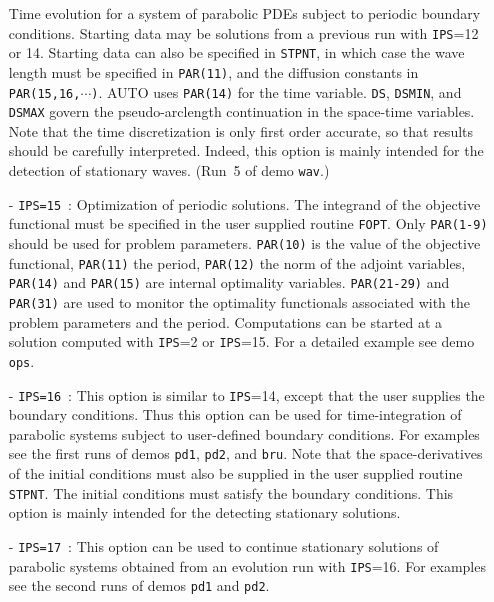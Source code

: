 \documentclass[12pt]{report}
\begin{document}
\begin{itemize}
  Time evolution for a system of parabolic PDEs subject to periodic 
  boundary conditions. 
  Starting data may be solutions from a previous run with {\tt IPS}=12 or 14. 
  Starting data can also be specified in {\tt STPNT}, in which case
  the wave length must be specified in {\tt PAR(11)}, and the diffusion
  constants in {\tt PAR(15,16,$\cdots$)}.
  {\cal AUTO} uses {\tt PAR(14)} for the time variable.
  {\tt DS}, {\tt DSMIN}, and {\tt DSMAX} govern the pseudo-arclength continuation 
  in the space-time variables.
  Note that the time discretization is only first order accurate, 
  so that results should be carefully interpreted. 
  Indeed, this option is mainly intended for the detection of stationary 
  waves.
  (Run~5 of demo {\tt wav}.)
\item[-] {\tt IPS=15}~:   
  Optimization of periodic solutions. The integrand of the
  objective functional must be specified in the user supplied
  routine {\tt FOPT}. Only {\tt PAR(1-9)} should be used for
  problem parameters. {\tt PAR(10)} is the value of the objective
  functional, {\tt PAR(11)} the period, {\tt PAR(12)} the norm of the
  adjoint variables, {\tt PAR(14)} and {\tt PAR(15)} are internal optimality
  variables. {\tt PAR(21-29)} and {\tt PAR(31)} are used to monitor the 
  optimality functionals associated with the problem parameters 
  and the period. 
  Computations can be started at a solution computed with {\tt IPS}=2
  or {\tt IPS}=15.
  For a detailed example see demo {\tt ops}.
\item[-] {\tt IPS=16}~:
  This option is similar to {\tt IPS}=14, except that the user supplies the
  boundary conditions. Thus this option can be used for 
  time-integration of parabolic systems subject to 
  user-defined boundary conditions. For examples see the first runs
  of demos {\tt pd1}, {\tt pd2}, and {\tt bru}. Note that
  the space-derivatives of the initial conditions must
  also be supplied in the user supplied routine {\tt STPNT}. 
  The initial conditions must satisfy the boundary conditions.
  This option is mainly intended for the detecting stationary solutions.
 \item[-] {\tt IPS=17}~: 
  This option can be used to continue stationary solutions
  of parabolic systems obtained from an evolution run with {\tt IPS}=16.
  For examples see the second runs of demos {\tt pd1} and {\tt pd2}.
\end{itemize}
\end{document}
